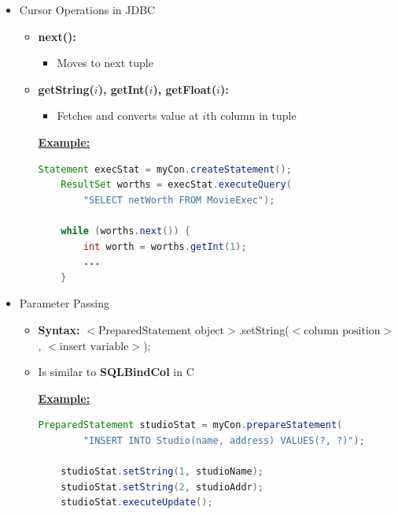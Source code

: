 \documentclass[12pt]{article}
\begin{document}
\begin{enumerate}[1.]
\begin{enumerate}[a)]
\begin{itemize}
\begin{itemize}
\begin{enumerate}[1.]
                \end{enumerate}
                \item Cursor Operations in JDBC
                \begin{itemize}
                    \item \textbf{next():}
                    \begin{itemize}
                        \item Moves to next tuple
                    \end{itemize}
                    \item \textbf{getString($i$), getInt($i$), getFloat($i$):}
                    \begin{itemize}
                        \item Fetches and converts value at $i$th column in tuple
                    \end{itemize}

                    \bigskip

                    \underline{\textbf{Example:}}

                    \bigskip

    \begin{lstlisting}[language=JAVA]
    Statement execStat = myCon.createStatement();
    ResultSet worths = execStat.executeQuery(
        "SELECT netWorth FROM MovieExec");

    while (worths.next()) {
        int worth = worths.getInt(1);
        ...
    }
    \end{lstlisting}

                \end{itemize}
                \item Parameter Passing
                \begin{itemize}
                    \item \textbf{Syntax:} $<\text{PreparedStatement object}>$.setString($<\text{column position}>$, $<\text{insert variable}>$);
                    \item Is similar to \textbf{SQLBindCol} in C

                    \bigskip

                    \underline{\textbf{Example:}}

                    \bigskip

    \begin{lstlisting}[language=JAVA]
    PreparedStatement studioStat = myCon.prepareStatement(
        "INSERT INTO Studio(name, address) VALUES(?, ?)");

    studioStat.setString(1, studioName);
    studioStat.setString(2, studioAddr);
    studioStat.executeUpdate();
    \end{lstlisting}
                \end{itemize}
            \end{itemize}
        \end{itemize}
    \end{enumerate}

\end{enumerate}
\end{document}
